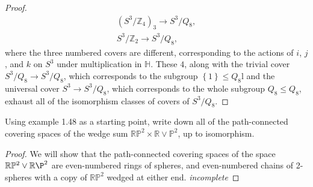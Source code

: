 \documentclass[12pt]{article}
\newcommand{\Z}{\mathbb{Z}}
\newcommand{\R}{\mathbb{R}}
\theoremstyle{definition}
\newenvironment{problem}[2][Problem]{\begin{trivlist}
\item[\hskip \labelsep {\bfseries #1}\hskip \labelsep {\bfseries #2.}]}{\end{trivlist}}
\begin{document}
\begin{problem}{1}
\begin{enumerate}[label=(\alph*)]
\begin{proof}
\begin{align*}
				(S^3 / \Z_4)_3 \to S^3 / Q_8,\\
					S^3 / \Z_2 \to S^3 / Q_8,
				\end{align*} where the three numbered covers are different, corresponding to the actions of $i$, $j$, and $k$ on $S^3$ under multiplication in $\mathbb H$. These $4$, along with the trivial cover $S^3 / Q_8 \to S^3 / Q_8$, which corresponds to the subgroup $\left\{ 1 \right\} \leq Q_8$l and the universal cover $S^3 \to S^3 / Q_8$, which corresponds to the whole subgroup $Q_8 \leq Q_8$, exhaust all of the isomorphism classes of covers of $S^3 /Q_8$.
\end{proof}
	\end{enumerate}
\end{problem}
\begin{problem}{2}
	Using example 1.48 as a starting point, write down all of the path-connected covering spaces of the wedge sum $\R \mathbb P^2 \times \R \vee \mathbb P^2$, up to isomorphism.
	\begin{proof}
		\par We will show that the path-connected covering spaces of the space $\R\mathbb P^2 \vee \R \mathbb \P^2$ are even-numbered rings of spheres, and even-numbered chains of 2-spheres with a copy of $\R \mathbb P^2 $ wedged at either end. 
		\textit{incomplete} 
	\end{proof}
\end{problem}
\maketitle
\end{document}
